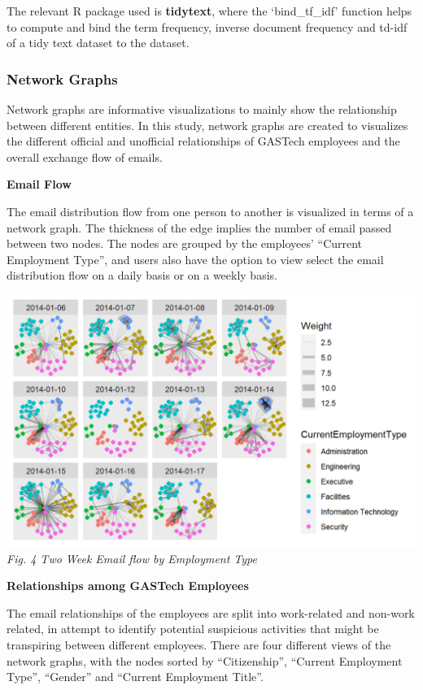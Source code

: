 \documentclass{acm_proc_article-sp}
\begin{document}
The relevant R package used is \textbf{tidytext}, where the
`bind\_tf\_idf' function helps to compute and bind the term frequency,
inverse document frequency and td-idf of a tidy text dataset to the
dataset.

\hypertarget{network-graphs-1}{%
\subsubsection{Network Graphs}\label{network-graphs-1}}

Network graphs are informative visualizations to mainly show the
relationship between different entities. In this study, network graphs
are created to visualizes the different official and unofficial
relationships of GASTech employees and the overall exchange flow of
emails.

\textbf{Email Flow}

The email distribution flow from one person to another is visualized in
terms of a network graph. The thickness of the edge implies the number
of email passed between two nodes. The nodes are grouped by the
employees' ``Current Employment Type'', and users also have the option
to view select the email distribution flow on a daily basis or on a
weekly basis.

\includegraphics{img/image09.png} \emph{Fig. 4 Two Week Email flow by
Employment Type}

\textbf{Relationships among GASTech Employees}

The email relationships of the employees are split into work-related and
non-work related, in attempt to identify potential suspicious activities
that might be transpiring between different employees. There are four
different views of the network graphs, with the nodes sorted by
``Citizenship'', ``Current Employment Type'', ``Gender'' and ``Current
Employment Title''.
\end{document}

